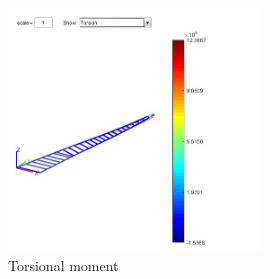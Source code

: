 \begin{figure}[h]
	\centering
	\includegraphics[width=0.6\textwidth]{img/Torsion.jpg}
	\caption{Torsional moment}
	\label{fig:torsion}
\end{figure}

